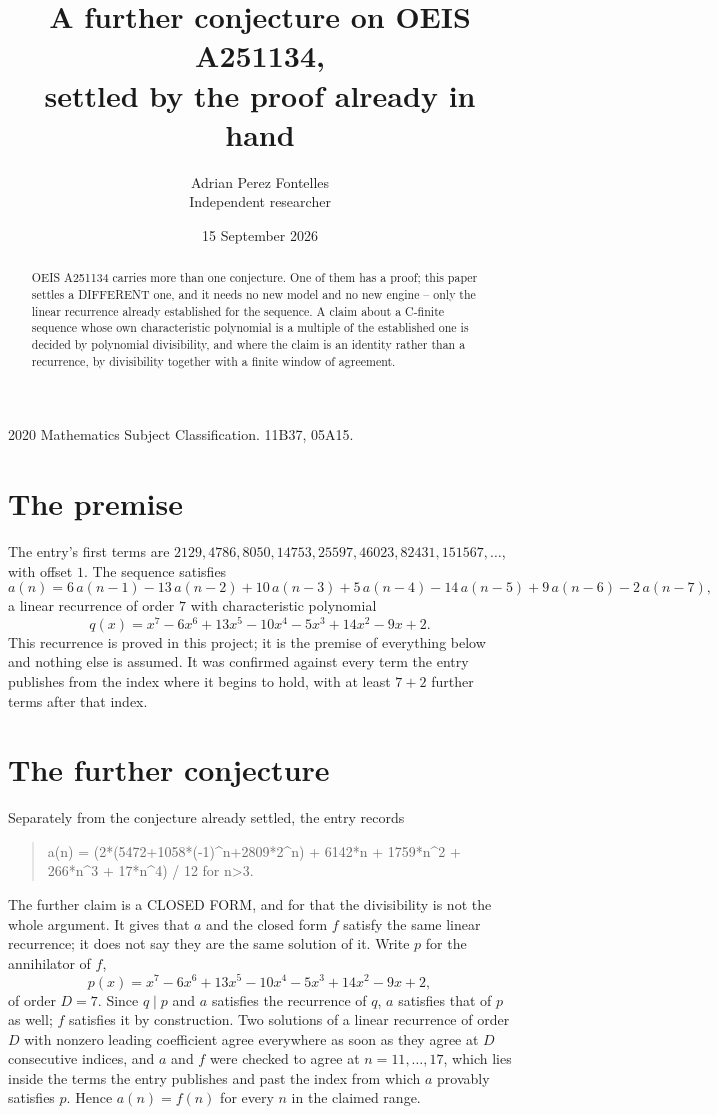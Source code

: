 \documentclass[11pt,a4paper]{article}
\title{A further conjecture on OEIS A251134,\\ \large settled by the proof already in hand}
\author{Adrian Perez Fontelles\\ \small Independent researcher}
\date{15 September 2026}
\theoremstyle{plain}
\theoremstyle{definition}
\begin{document}
\maketitle

\begin{abstract}
OEIS A251134 carries more than one conjecture. One of them has a proof; this paper settles a
DIFFERENT one, and it needs no new model and no new engine -- only the linear recurrence already
established for the sequence. A claim about a C-finite sequence whose own characteristic
polynomial is a multiple of the established one is decided by polynomial divisibility, and where
the claim is an identity rather than a recurrence, by divisibility together with a finite window
of agreement.
\end{abstract}

\noindent\small 2020 Mathematics Subject Classification. 11B37, 05A15.\normalsize

\section{The premise}

The entry's first terms are $2129, 4786, 8050, 14753, 25597, 46023, 82431, 151567,\dots$, with offset $1$. The sequence satisfies
\[
  a(n)=6\,a(n-1) - 13\,a(n-2) + 10\,a(n-3) + 5\,a(n-4) - 14\,a(n-5) + 9\,a(n-6) - 2\,a(n-7) ,
\]
a linear recurrence of order $7$ with characteristic polynomial
\[
  q(x)=x^{7} - 6 x^{6} + 13 x^{5} - 10 x^{4} - 5 x^{3} + 14 x^{2} - 9 x + 2 .
\]
This recurrence is proved in this project; it is the premise of everything below and nothing else is assumed.
It was confirmed against every term the entry publishes from the index where it begins to hold,
with at least $7+2$ further terms after that index.

\section{The further conjecture}

Separately from the conjecture already settled, the entry records

\begin{quote}\raggedright a(n) = (2*(5472+1058*(-1)\^{}n+2809*2\^{}n) + 6142*n + 1759*n\^{}2 + 266*n\^{}3 + 17*n\^{}4) / 12 for n>3.\end{quote}

The further claim is a CLOSED FORM, and for that the divisibility is not the whole argument. It
gives that $a$ and the closed form $f$ satisfy the same linear recurrence; it does not say they
are the same solution of it. Write $p$ for the annihilator of $f$,
\[
  p(x)=x^{7} - 6 x^{6} + 13 x^{5} - 10 x^{4} - 5 x^{3} + 14 x^{2} - 9 x + 2 ,
\]
of order $D=7$. Since $q\mid p$ and $a$ satisfies the recurrence of $q$, $a$ satisfies that of
$p$ as well; $f$ satisfies it by construction. Two solutions of a linear recurrence of order $D$
with nonzero leading coefficient agree everywhere as soon as they agree at $D$ consecutive
indices, and $a$ and $f$ were checked to agree at $n=11,\dots,17$,
which lies inside the terms the entry publishes and past the index from which $a$ provably
satisfies $p$. Hence $a(n)=f(n)$ for every $n$ in the claimed range.
\end{document}
